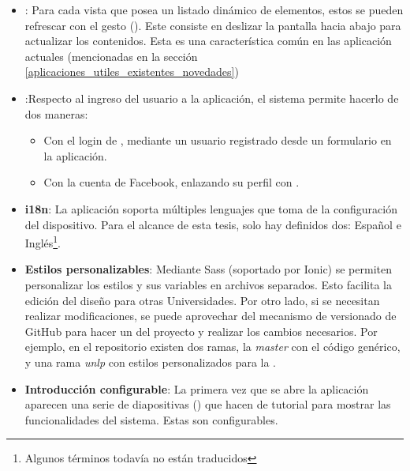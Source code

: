 \begin{itemize}
\item \textbf{}: Para cada vista que posea un listado dinámico de elementos, estos se pueden refrescar con el gesto  (). Este consiste en deslizar la pantalla hacia abajo para actualizar los contenidos. Esta es una característica común en las aplicación actuales (mencionadas en la sección \ref{aplicaciones_utiles_existentes_novedades})

\item \textbf{}:Respecto al ingreso del usuario a la aplicación, el sistema permite hacerlo de dos maneras:
\begin{itemize}
\item Con el login de \nombreApp, mediante un usuario registrado desde un formulario en la aplicación.
\item Con la cuenta de Facebook, enlazando su perfil con \nombreApp.
\end{itemize}


\item \textbf{\gls{i18n}}: La aplicación soporta múltiples lenguajes que toma de la configuración del dispositivo. Para el alcance de esta tesis, solo hay definidos dos: Español e Inglés\footnote{Algunos términos todavía no están traducidos}. 

\item \textbf{Estilos personalizables}: Mediante Sass (soportado por Ionic) se permiten personalizar los estilos y sus variables en archivos separados. Esto facilita la edición del diseño para otras Universidades. Por otro lado, si se necesitan realizar modificaciones, se puede aprovechar del mecanismo de versionado de GitHub para hacer un  del proyecto y realizar los cambios necesarios. Por ejemplo, en el repositorio existen dos ramas, la \textit{master} con el código genérico, y una rama \textit{unlp} con estilos personalizados para la \unlp{}.

\item \textbf{Introducción configurable}: La primera vez que se abre la aplicación aparecen una serie de diapositivas () que hacen de tutorial para mostrar las funcionalidades del sistema. Estas son configurables.

\end{itemize}
